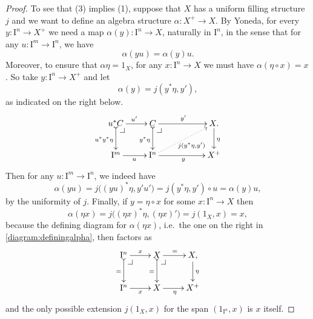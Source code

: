 \documentclass[11pt]{amsart}
\makeatletter
\newcommand{\ra}{\ensuremath{\rightarrow}}
\newcommand{\I}{\ensuremath{\mathrm{I}}}
\theoremstyle{remark}
\theoremstyle{definition}
\newcommand{\pbcorner}[1][dr]{\save*!/#1-1.2pc/#1:(-1,1)@^{|-}\restore}
\makeatother
\begin{document}
\begin{proof}
To see that (3) implies (1), suppose that $X$ has a uniform filling structure $j$ and we want to define an algebra structure $\alpha : X^+ \ra X$. By Yoneda, for every $y : \I^n \ra X^+$ we need a map $\alpha(y) : \I^n \ra X$, naturally in $\I^n$, in the sense that for any $u : \I^m \ra \I^n$, we have
\begin{equation}\label{eq:proof,plusstructure}
\alpha(yu) = \alpha(y)u.
\end{equation}
Moreover, to ensure that $\alpha\eta = 1_X$, for any $x : \I^n \ra X$ we must have $\alpha(\eta\circ x) = x$. So take $y : \I^n \ra X^+$  and let $$\alpha(y) = j(y^*\eta, y'),$$
as indicated on the right below.
\begin{equation}\label{diagram:definingalpha}
\xymatrix{
u^*C \ar@{>->}[d]_{u^*y^*\eta} \ar[r]^{u'} \pbcorner &  C \ar@{>->}[d]_{y^*\eta} \ar[rr]^{y'}\pbcorner && X \ar[d]^\eta . \\
\I^{m} \ar[r]_{u} & \I^{n} \ar@{.>}[rru]_{j(y^*\eta,y')} \ar[rr]_{y} && X^+
}
\end{equation}
Then for any $u : \I^m \ra \I^n$, we indeed have 
$$\alpha(yu) =  j\big( (yu)^*\eta, y'u' \big) = j(y^*\eta, y')\circ u = \alpha(y)u,$$
 by the uniformity of $j$. Finally, if $y=\eta\circ x$ for some $x : \I^n\ra X$ then 
 $$\alpha(\eta x) =  j\big( (\eta x)^*\eta, (\eta x)'\big) = j(1_X, x) = x,$$
 because the defining diagram for $\alpha(\eta x)$, i.e.\ the one on the right in \eqref{diagram:definingalpha}, then factors as
 \begin{equation}\label{diagram:definingalphatwo}
\xymatrix{
\I^n \ar@{>->}[d]_{=} \ar[r]^{x} \pbcorner &  X \ar@{>->}[d]_{=} \ar[r]^{=}\pbcorner & X \ar[d]^\eta , \\
\I^{n} \ar[r]_{x} & X  \ar[r]_{\eta} & X^+
}
\end{equation}
and the only possible extension $j(1_X, x)$ for the span $(1_{\I^n}, x)$ is  $x$ itself.
 \end{proof}
 
\end{document}
